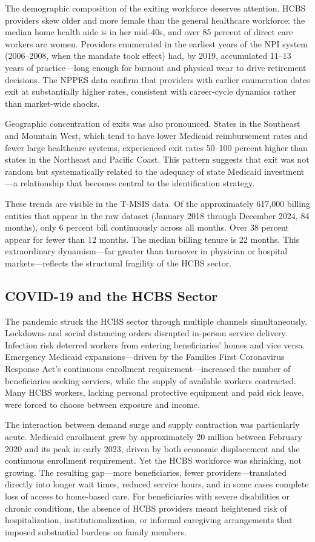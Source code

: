 \documentclass[12pt]{article}
\begin{document}
The demographic composition of the exiting workforce deserves attention. HCBS providers skew older and more female than the general healthcare workforce: the median home health aide is in her mid-40s, and over 85 percent of direct care workers are women. Providers enumerated in the earliest years of the NPI system (2006--2008, when the mandate took effect) had, by 2019, accumulated 11--13 years of practice---long enough for burnout and physical wear to drive retirement decisions. The NPPES data confirm that providers with earlier enumeration dates exit at substantially higher rates, consistent with career-cycle dynamics rather than market-wide shocks.

Geographic concentration of exits was also pronounced. States in the Southeast and Mountain West, which tend to have lower Medicaid reimbursement rates and fewer large healthcare systems, experienced exit rates 50--100 percent higher than states in the Northeast and Pacific Coast. This pattern suggests that exit was not random but systematically related to the adequacy of state Medicaid investment---a relationship that becomes central to the identification strategy.

These trends are visible in the T-MSIS data. Of the approximately 617,000 billing entities that appear in the raw dataset (January 2018 through December 2024, 84 months), only 6 percent bill continuously across all months. Over 38 percent appear for fewer than 12 months. The median billing tenure is 22 months. This extraordinary dynamism---far greater than turnover in physician or hospital markets---reflects the structural fragility of the HCBS sector.

\subsection{COVID-19 and the HCBS Sector}

The pandemic struck the HCBS sector through multiple channels simultaneously. Lockdowns and social distancing orders disrupted in-person service delivery. Infection risk deterred workers from entering beneficiaries' homes and vice versa. Emergency Medicaid expansions---driven by the Families First Coronavirus Response Act's continuous enrollment requirement---increased the number of beneficiaries seeking services, while the supply of available workers contracted. Many HCBS workers, lacking personal protective equipment and paid sick leave, were forced to choose between exposure and income.

The interaction between demand surge and supply contraction was particularly acute. Medicaid enrollment grew by approximately 20 million between February 2020 and its peak in early 2023, driven by both economic displacement and the continuous enrollment requirement. Yet the HCBS workforce was shrinking, not growing. The resulting gap---more beneficiaries, fewer providers---translated directly into longer wait times, reduced service hours, and in some cases complete loss of access to home-based care. For beneficiaries with severe disabilities or chronic conditions, the absence of HCBS providers meant heightened risk of hospitalization, institutionalization, or informal caregiving arrangements that imposed substantial burdens on family members.
\end{document}
